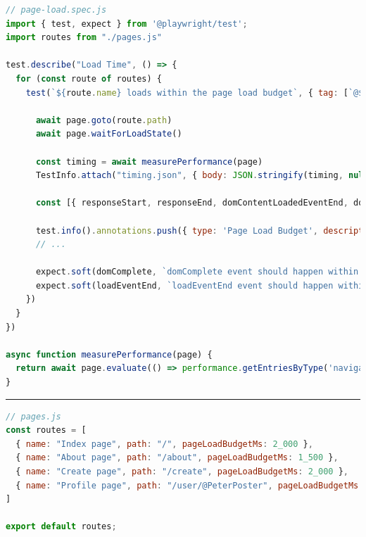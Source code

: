 \documentclass[a4paper, 12pt]{article}
\begin{document}
\vspace{1cm}
\begin{lstlisting}[caption={Test file for page load times}, label={lst:page-load-spec}, language=JavaScript]
// page-load.spec.js
import { test, expect } from '@playwright/test';
import routes from "./pages.js"

test.describe("Load Time", () => {
  for (const route of routes) {
    test(`${route.name} loads within the page load budget`, { tag: [`@${route.name}`, '@pageLoad'] }, async ({ page }, TestInfo) => {

      await page.goto(route.path)
      await page.waitForLoadState()

      const timing = await measurePerformance(page)
      TestInfo.attach("timing.json", { body: JSON.stringify(timing, null, 2), contentType: "application/json" })

      const [{ responseStart, responseEnd, domContentLoadedEventEnd, domComplete, loadEventEnd }] = timing;

      test.info().annotations.push({ type: 'Page Load Budget', description: `The time budget for this page was ${route.pageLoadBudgetMs}ms` });
      // ...

      expect.soft(domComplete, `domComplete event should happen within ${route.pageLoadBudgetMs} ms`).toBeLessThanOrEqual(route.pageLoadBudgetMs)
      expect.soft(loadEventEnd, `loadEventEnd event should happen within ${route.pageLoadBudgetMs} ms`).toBeLessThanOrEqual(route.pageLoadBudgetMs)
    })
  }
})

async function measurePerformance(page) {
  return await page.evaluate(() => performance.getEntriesByType('navigation'));
}

\end{lstlisting}
\hrule
\begin{lstlisting}[caption={Test pages configuration}, label={lst:pages-config}, language=JavaScript]
// pages.js
const routes = [
  { name: "Index page", path: "/", pageLoadBudgetMs: 2_000 },
  { name: "About page", path: "/about", pageLoadBudgetMs: 1_500 },
  { name: "Create page", path: "/create", pageLoadBudgetMs: 2_000 },
  { name: "Profile page", path: "/user/@PeterPoster", pageLoadBudgetMs: 2_000 },
]

export default routes;
\end{lstlisting}
\vspace{1cm}
\end{document}
